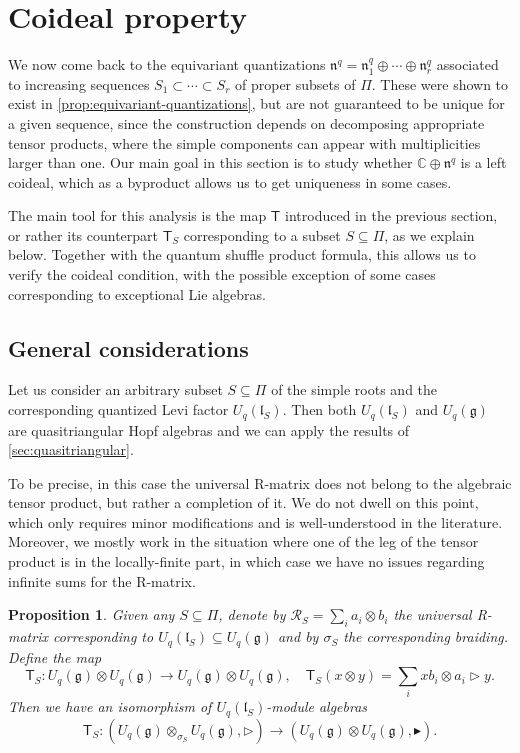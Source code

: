 \documentclass[a4paper, 12pt, reqno, english]{amsart}
\numberwithin{equation}{section}
\numberwithin{figure}{section}
\theoremstyle{plain}
\theoremstyle{plain}
\theoremstyle{plain}
\newtheorem{proposition}[theorem]{Proposition}
\theoremstyle{plain}
\theoremstyle{plain}
\theoremstyle{definition}
\theoremstyle{definition}
\theoremstyle{definition}
\theoremstyle{remark}
\theoremstyle{definition}
\theoremstyle{definition}
\newcommand{\Uqg}{U_q(\mathfrak{g})}
\newcommand{\UqlS}{U_q(\mathfrak{l}_S)}
\newcommand{\bbC}{\mathbb{C}}
\newcommand{\lien}{\mathfrak{n}}
\newcommand{\calR}{\mathcal{R}}
\newcommand{\simpleroots}{\Pi}
\newcommand{\tmap}{\mathsf{T}}
\newcommand{\tmapS}{\mathsf{T}_S}
\newcommand{\qnil}{\lien^q}
\begin{document}
\section{Coideal property}
\label{sec:coideal}

We now come back to the equivariant quantizations $\qnil = \qnil_1 \oplus \cdots \oplus \qnil_r$ associated to increasing sequences $S_1 \subset \cdots \subset S_r$ of proper subsets of $\simpleroots$.
These were shown to exist in \cref{prop:equivariant-quantizations}, but are not guaranteed to be unique for a given sequence, since the construction depends on decomposing appropriate tensor products, where the simple components can appear with multiplicities larger than one.
Our main goal in this section is to study whether $\bbC \oplus \qnil$ is a left coideal, which as a byproduct allows us to get uniqueness in some cases.

The main tool for this analysis is the map $\tmap$ introduced in the previous section, or rather its counterpart $\tmap_S$ corresponding to a subset $S \subseteq \simpleroots$, as we explain below.
Together with the quantum shuffle product formula, this allows us to verify the coideal condition, with the possible exception of some cases corresponding to exceptional Lie algebras.

\subsection{General considerations}

Let us consider an arbitrary subset $S \subseteq \simpleroots$ of the simple roots and the corresponding quantized Levi factor $\UqlS$.
Then both $\UqlS$ and $\Uqg$ are quasitriangular Hopf algebras and we can apply the results of \cref{sec:quasitriangular}.

To be precise, in this case the universal R-matrix does not belong to the algebraic tensor product, but rather a completion of it. We do not dwell on this point, which only requires minor modifications and is well-understood in the literature.
Moreover, we mostly work in the situation where one of the leg of the tensor product is in the locally-finite part, in which case we have no issues regarding infinite sums for the R-matrix.

\begin{proposition}
Given any $S \subseteq \simpleroots$, denote by $\calR_S = \sum_i a_i \otimes b_i$ the universal R-matrix corresponding to $\UqlS \subseteq \Uqg$ and by $\sigma_S$ the corresponding braiding.
Define the map
\[
\tmapS: \Uqg \otimes \Uqg \to \Uqg \otimes \Uqg, \quad
\tmapS(x \otimes y) = \sum_i x b_i \otimes a_i \triangleright y.
\]
Then we have an isomorphism of $\UqlS$-module algebras
\[
\tmapS: (\Uqg \otimes_{\sigma_S} \Uqg, \triangleright) \to (\Uqg \otimes \Uqg, \blacktriangleright).
\]
\end{proposition}
\end{document}

